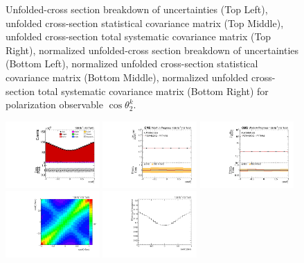 \begin{figure}[htb]
\begin{center}
\caption{Unfolded-cross section breakdown of uncertainties (Top Left), unfolded cross-section statistical covariance matrix (Top Middle), unfolded cross-section total systematic covariance matrix (Top Right), normalized unfolded-cross section breakdown of uncertainties (Bottom Left), normalized unfolded cross-section statistical covariance matrix (Bottom Middle), normalized unfolded cross-section total systematic covariance matrix (Bottom Right) for polarization observable $\cos\theta_{2}^{k}$.}
\label{fig:b2k_uncertainties}
\end{center}
\end{figure}
\clearpage
\begin{figure}[htb]
\begin{center}
 \includegraphics[width=0.32\textwidth]{fig_fullRun2UL/controlplots/combined/Hyp_AntiLeptonBn.pdf}
 \includegraphics[width=0.32\textwidth]{fig_fullRun2UL/unfolding/combined/UnfoldedResults_b1n.pdf}
 \includegraphics[width=0.32\textwidth]{fig_fullRun2UL/unfolding/combined/UnfoldedResultsNorm_b1n.pdf} \\
 \includegraphics[width=0.32\textwidth]{fig_fullRun2UL/unfolding/combined/ResponseMatrix_b1n.pdf}
 \includegraphics[width=0.32\textwidth]{fig_fullRun2UL/unfolding/combined/TotEff_b1n.pdf}

\end{center}
\end{figure}
